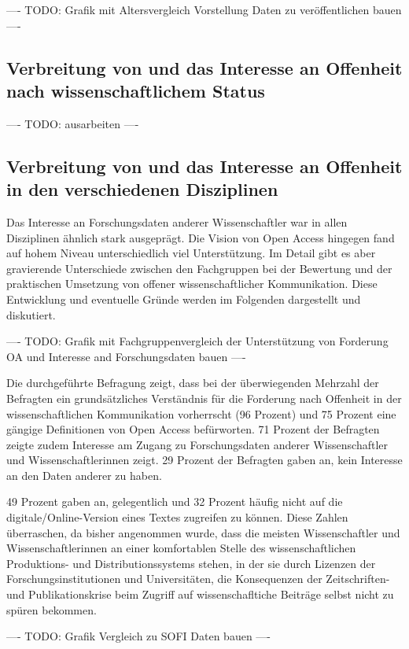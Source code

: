 ---- TODO: Grafik mit Altersvergleich Vorstellung Daten zu veröffentlichen bauen  ----

\subsection{Verbreitung von und das Interesse an Offenheit nach wissenschaftlichem Status }

---- TODO: ausarbeiten  ----

\subsection{Verbreitung von und das Interesse an Offenheit in den verschiedenen Disziplinen}

Das Interesse an Forschungsdaten anderer Wissenschaftler war in allen Disziplinen ähnlich stark ausgeprägt. Die Vision von Open Access hingegen fand auf hohem Niveau unterschiedlich viel Unterstützung. Im Detail gibt es aber gravierende Unterschiede zwischen den Fachgruppen bei der Bewertung und der praktischen Umsetzung von offener wissenschaftlicher Kommunikation. Diese Entwicklung und eventuelle Gründe werden im Folgenden dargestellt und diskutiert.

---- TODO: Grafik mit Fachgruppenvergleich der Unterstützung von Forderung OA und Interesse and Forschungsdaten bauen  ----

Die durchgeführte Befragung zeigt, dass bei der überwiegenden Mehrzahl der Befragten ein grundsätzliches Verständnis für die Forderung nach Offenheit in der wissenschaftlichen Kommunikation vorherrscht (96 Prozent) und 75 Prozent eine gängige Definitionen von Open Access befürworten. 71 Prozent der Befragten zeigte zudem Interesse am Zugang zu Forschungsdaten anderer Wissenschaftler und Wissenschaftlerinnen zeigt. 29 Prozent der Befragten gaben an, kein Interesse an den Daten anderer zu haben.

49 Prozent gaben an, gelegentlich und 32 Prozent häufig nicht auf die digitale/Online-Version eines Textes zugreifen zu können. Diese Zahlen überraschen, da bisher angenommen wurde, dass die meisten Wissenschaftler und Wissenschaftlerinnen an einer komfortablen Stelle des wissenschaftlichen Produktions- und Distributionssystems \cite{herb_2010} stehen, in der sie durch Lizenzen der Forschungsinstitutionen und Universitäten, die Konsequenzen der Zeitschriften- und Publikationskrise beim Zugriff auf wissenschafltiche Beiträge selbst nicht zu spüren bekommen.

---- TODO: Grafik Vergleich zu SOFI Daten bauen ----

